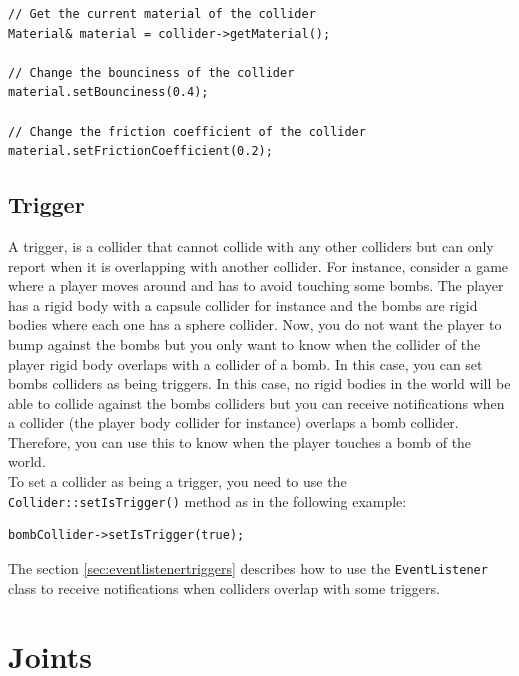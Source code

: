 \documentclass[a4paper,12pt]{article}
\begin{document}
    \begin{lstlisting}
// Get the current material of the collider
Material& material = collider->getMaterial();

// Change the bounciness of the collider
material.setBounciness(0.4);

// Change the friction coefficient of the collider
material.setFrictionCoefficient(0.2);
  \end{lstlisting}

    \subsection{Trigger}
    \label{sec:trigger}

    A trigger, is a collider that cannot collide with any other colliders but can only report when it is overlapping with another collider. For instance,
    consider a game where a player moves around and has to avoid touching some bombs. The player has a rigid body with a capsule collider for instance and
    the bombs are rigid bodies where each one has a sphere collider. Now, you do not want the player to bump against the bombs but you only want to know
    when the collider of the player rigid body overlaps with a collider of a bomb. In this case, you can set bombs colliders as being triggers. In this
    case, no rigid bodies in the world will be able to collide against the bombs colliders but you can receive notifications when a collider (the player
    body collider for instance) overlaps a bomb collider. Therefore, you can use this to know when the player touches a bomb of the world. \\
    
    To set a collider as being a trigger, you need to use the \texttt{Collider::setIsTrigger()} method as in the following example: \\

    \begin{lstlisting}
bombCollider->setIsTrigger(true);
   \end{lstlisting}

  
   \vspace{0.6cm}

   The section \ref{sec:eventlistenertriggers} describes how to use the \texttt{EventListener} class to receive notifications when colliders overlap
   with some triggers.
    
    \section{Joints}
\end{document}
